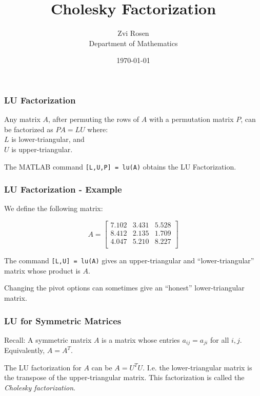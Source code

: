 \documentclass[12pt]{beamer}
\theoremstyle{definition}
\begin{document}
\author[Z. Rosen]{Zvi Rosen \\ Department of Mathematics}

\date[\today]{\today}
\title[Cholesky Factorization]{{\Large Cholesky Factorization}}


\frame{\titlepage}


\begin{frame}
\frametitle{LU Factorization}
Any matrix $A$, after permuting the rows of $A$ with a permutation 
matrix $P$,
can be factorized as $PA = LU$ where:\\ \vspace{4mm}
$L$ is lower-triangular, and\\
$U$ is upper-triangular. \\ \vspace{4mm}

The MATLAB command {\tt [L,U,P] = lu(A)} obtains the LU Factorization.

\end{frame}


\begin{frame}
\frametitle{LU Factorization - Example}
We define the following matrix:

\[
A = \left[ \begin{array}{ccc} 
7.102 & 3.431 & 5.528 \\
    8.412 & 2.135 & 1.709 \\
    4.047 & 5.210 & 8.227 \\
\end{array} \right]
\]

The command {\tt [L,U] = lu(A)} gives an upper-triangular
and ``lower-triangular'' matrix whose product is $A$. \\ \vspace{4mm}

Changing the pivot options can sometimes give an ``honest''
lower-triangular matrix.

\end{frame}

\begin{frame}
\frametitle{LU for Symmetric Matrices}

Recall: A symmetric matrix $A$ is a matrix whose entries
$a_{ij} = a_{ji}$ for all $i,j$. Equivalently, $A = A^T$.

The LU factorization for $A$ can be $A = U^TU$. I.e. the
lower-triangular matrix is the transpose of the upper-triangular
matrix. This factorization is called the {\em Cholesky factorization}.

\end{frame} 
\end{document}
